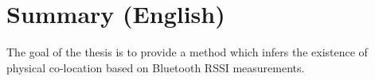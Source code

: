 \chapter{Summary (English)}

The goal of the thesis is to provide a method which infers the existence of physical co-location based on Bluetooth RSSI measurements.